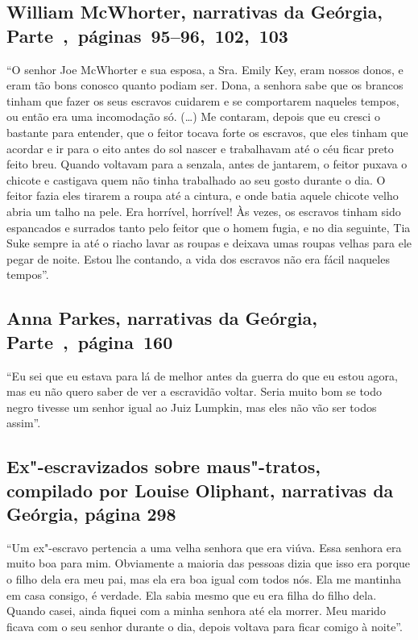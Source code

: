 \subsection{William McWhorter, narrativas da Geórgia, Parte~,~páginas~95--96,~102,~103}
\label{ref190}

``O senhor Joe McWhorter e sua esposa, a Sra. Emily Key, eram nossos
donos, e eram tão bons conosco quanto podiam ser. Dona, a senhora sabe
que os brancos tinham que fazer os seus escravos cuidarem e se
comportarem naqueles tempos, ou então era uma incomodação só. (\ldots{})
Me contaram, depois que eu cresci o bastante para entender, que o feitor
tocava forte os escravos, que eles tinham que acordar e ir para o eito
antes do sol nascer e trabalhavam até o céu ficar preto feito breu.
Quando voltavam para a senzala, antes de jantarem, o feitor puxava o
chicote e castigava quem não tinha trabalhado ao seu gosto durante o
dia. O feitor fazia eles tirarem a roupa até a cintura, e onde batia
aquele chicote velho abria um talho na pele. Era horrível, horrível! Às
vezes, os escravos tinham sido espancados e surrados tanto pelo feitor
que o homem fugia, e no dia seguinte, Tia Suke sempre ia até o riacho
lavar as roupas e deixava umas roupas velhas para ele pegar de noite.
Estou lhe contando, a vida dos escravos não era fácil naqueles tempos''.

\subsection{Anna Parkes, narrativas da Geórgia, Parte~,~página~160}
\label{ref208}

``Eu sei que eu estava para lá de melhor antes da guerra do que eu estou
agora, mas eu não quero saber de ver a escravidão voltar. Seria muito
bom se todo negro tivesse um senhor igual ao Juiz Lumpkin, mas eles não
vão ser todos assim''.

\subsection{Ex"-escravizados sobre maus"-tratos, compilado por Louise Oliphant, narrativas
da Geórgia, página 298}

``Um ex"-escravo pertencia a uma velha senhora que era viúva. Essa
senhora era muito boa para mim. Obviamente a maioria das pessoas dizia
que isso era porque o filho dela era meu pai, mas ela era boa igual com
todos nós. Ela me mantinha em casa consigo, é verdade. Ela sabia mesmo
que eu era filha do filho dela. Quando casei, ainda fiquei com a minha
senhora até ela morrer. Meu marido ficava com o seu senhor durante o
dia, depois voltava para ficar comigo à noite''.

